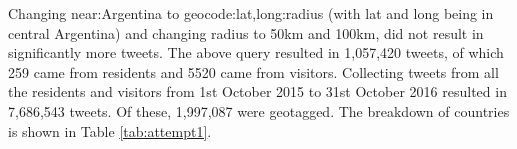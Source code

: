 
Changing {\selectfont near:Argentina} to {\selectfont geocode:lat,long:radius} (with {\selectfont lat} and {\selectfont long} being in central Argentina) and changing radius to {\selectfont 50km} and {\selectfont 100km}, did not result in significantly more tweets. The above query resulted in 1,057,420 tweets, of which 259 came from residents and 5520 came from visitors.
Collecting tweets from all the residents and visitors from 1st October 2015 to 31st October 2016 resulted in 7,686,543 tweets. Of these, 1,997,087 were geotagged. The breakdown of countries is shown in Table \ref{tab:attempt1}.

